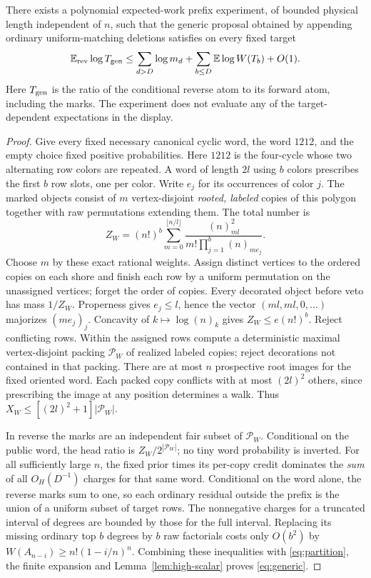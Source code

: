 \begin{lemma}\label{lem:head}
There exists a polynomial expected-work prefix experiment, of bounded physical length independent of $n$, such that the generic proposal obtained by appending ordinary uniform-matching deletions satisfies on every fixed target
\begin{equation}\label{eq:generic}
 \mathbb E_{\rm rev}\log T_{\rm gen}
       \le \sum_{d>D}\log m_d+\sum_{b\le D}\mathbb E\log W(T_b)+O(1).
\end{equation}
Here $T_{\rm gen}$ is the ratio of the conditional reverse atom to its forward atom, including the marks. The experiment does not evaluate any of the target-dependent expectations in the display.
\end{lemma}
\begin{proof}
Give every fixed necessary canonical cyclic word, the word $1212$, and the empty choice fixed positive probabilities. Here $1212$ is the four-cycle whose two alternating row colors are repeated. A word of length $2l$ using $b$ colors prescribes the first $b$ row slots, one per color. Write $e_j$ for its occurrences of color $j$. The marked objects consist of $m$ vertex-disjoint \emph{rooted, labeled} copies of this polygon together with raw permutations extending them. The total number is
\[
  Z_W=(n!)^b\sum_{m=0}^{\lfloor n/l\rfloor}
   \frac{(n)_{ml}^2}{m!\prod_{j=1}^b(n)_{m e_j}} .
\]
Choose $m$ by these exact rational weights. Assign distinct vertices to the ordered copies on each shore and finish each row by a uniform permutation on the unassigned vertices; forget the order of copies. Every decorated object before veto has mass $1/Z_W$. Properness gives $e_j\le l$, hence the vector $(ml,ml,0,\ldots)$ majorizes $(m e_j)_j$. Concavity of $k\mapsto\log(n)_k$ gives $Z_W\le e(n!)^b$. Reject conflicting rows. Within the assigned rows compute a deterministic maximal vertex-disjoint packing $\mathcal P_W$ of realized labeled copies; reject decorations not contained in that packing. There are at most $n$ prospective root images for the fixed oriented word. Each packed copy conflicts with at most $(2l)^2$ others, since prescribing the image at any position determines a walk. Thus $X_W\le[(2l)^2+1]|\mathcal P_W|$.

In reverse the marks are an independent fair subset of $\mathcal P_W$. Conditional on the public word, the head ratio is $Z_W/2^{|\mathcal P_W|}$; no tiny word probability is inverted. For all sufficiently large $n$, the fixed prior times its per-copy credit dominates the \emph{sum} of all $O_H(D^{-1})$ charges for that same word. Conditional on the word alone, the reverse marks sum to one, so each ordinary residual outside the prefix is the union of a uniform subset of target rows. The nonnegative charges for a truncated interval of degrees are bounded by those for the full interval. Replacing its missing ordinary top $b$ degrees by $b$ raw factorials costs only $O(b^2)$ by $W(A_{n-i})\ge n!(1-i/n)^n$. Combining these inequalities with \eqref{eq:partition}, the finite expansion and Lemma~\ref{lem:high-scalar} proves \eqref{eq:generic}.
\end{proof}

